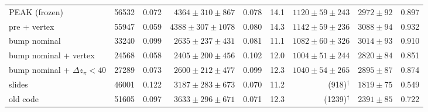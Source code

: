\begin{table}[H]
\begin{tabular}{lrrrrrrrr}
PEAK (frozen) & 56532 & 0.072 & $4364\pm310\pm867$ & 0.078 & 14.1 & $1120\pm59\pm243$ & $2972\pm92$ & 0.897 \\
pre + vertex & 55947 & 0.059 & $4388\pm307\pm1078$ & 0.080 & 14.3 & $1142\pm59\pm236$ & $3088\pm94$ & 0.932 \\
\midrule
bump nominal & 33240 & 0.099 & $2635\pm237\pm431$ & 0.081 & 11.1 & $1082\pm60\pm326$ & $3014\pm93$ & 0.910 \\
bump nominal + vertex & 24568 & 0.058 & $2405\pm200\pm456$ & 0.102 & 12.0 & $1004\pm51\pm244$ & $2820\pm84$ & 0.851 \\
bump nominal + $\Delta z_\pi<40$ & 27289 & 0.073 & $2600\pm212\pm477$ & 0.099 & 12.3 & $1040\pm54\pm265$ & $2895\pm87$ & 0.874 \\
\midrule
slides & 46001 & 0.122 & $3187\pm283\pm673$ & 0.070 & 11.2 & (918)$^\dagger$ & $1819\pm75$ & 0.549 \\
old code & 51605 & 0.097 & $3633\pm296\pm671$ & 0.071 & 12.3 & (1239)$^\dagger$ & $2391\pm85$ & 0.722 \\
\bottomrule
\end{tabular}
\end{table}
